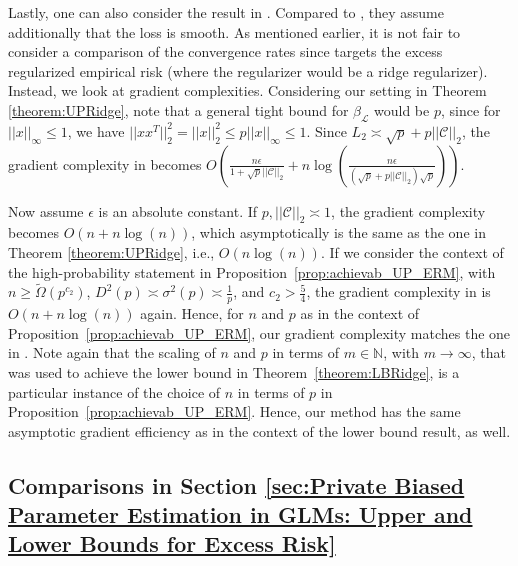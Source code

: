 \documentclass{article}
\begin{document}
Lastly, one can also consider the result in \cite{DP_ERM_Faster}. Compared to \cite{Bassily_SGD_l2}, they assume additionally that the loss is smooth. As mentioned earlier, it is not fair to consider a comparison of the convergence rates since \cite{DP_ERM_Faster} targets the excess regularized empirical risk (where the regularizer would be a ridge regularizer). Instead, we look at gradient complexities. Considering our setting in Theorem \ref{theorem:UPRidge}, note that a general tight bound for $\beta_{\mathcal{L}}$ would be $p$, since for $||x||_\infty \leq 1$, we have $||xx^T||_2^2 = ||x||_2^2 \leq p||x||_\infty \leq 1$. Since $L_2 \asymp \sqrt{p} + p||\mathcal{C}||_2$, the gradient complexity in \cite{DP_ERM_Faster} becomes $O\left(\frac{n\epsilon}{1 + \sqrt{p}||\mathcal{C}||_2} + n\log\left(\frac{n\epsilon}{(\sqrt{p} + p||\mathcal{C}||_2)\sqrt{p}}\right)\right)$.

Now assume $\epsilon$ is an absolute constant. If $p, ||\mathcal{C}||_2 \asymp 1$, the gradient complexity becomes $O\left(n + n\log\left(n\right)\right)$, which asymptotically is the same as the one in Theorem \ref{theorem:UPRidge}, i.e., $O(n\log(n))$. If we consider the context of the high-probability statement in Proposition~\ref{prop:achievab_UP_ERM}, with $n \geq \widetilde{\Omega}\left(p^{c_2}\right)$, $D^2(p) \asymp \sigma^2(p) \asymp \frac{1}{p}$, and $c_2 > \frac{5}{4}$, the gradient complexity in \cite{DP_ERM_Faster} is $O\left(n + n\log(n)\right)$ again. Hence, for $n$ and $p$ as in the context of Proposition~\ref{prop:achievab_UP_ERM}, our gradient complexity matches the one in \cite{DP_ERM_Faster}. Note again that the scaling of $n$ and $p$ in terms of $m \in \mathbb{N}$, with $m \rightarrow \infty$, that was used to achieve the lower bound in Theorem~\ref{theorem:LBRidge}, is a particular instance of the choice of $n$ in terms of $p$ in Proposition~\ref{prop:achievab_UP_ERM}. Hence, our method has the same asymptotic gradient efficiency as \cite{DP_ERM_Faster} in the context of the lower bound result, as well.


\subsection{Comparisons in Section \ref{sec:Private Biased Parameter Estimation in GLMs: Upper and Lower Bounds for Excess Risk}}\label{sec:Comparison_SGD_GLM}
\end{document}
